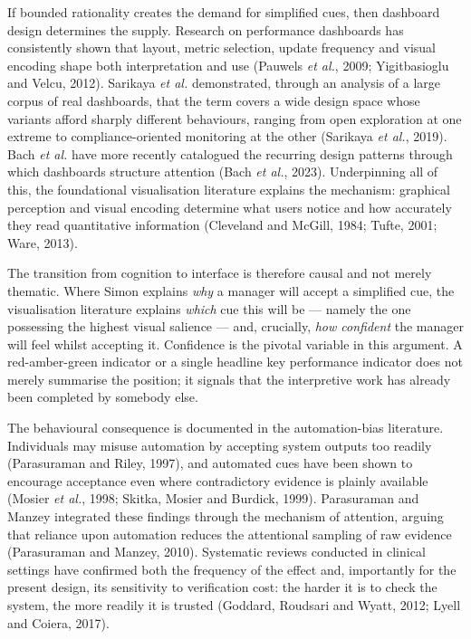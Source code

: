 \documentclass[11pt,a4paper]{article}
\numberwithin{figure}{section}
\numberwithin{table}{section}
\newcommand{\ct}[1]{\textcolor{citeblue}{#1}}          %
\begin{document}
If bounded rationality creates the demand for simplified cues, then dashboard design determines
the supply. Research on performance dashboards has consistently shown that layout, metric
selection, update frequency and visual encoding shape both interpretation and use \ct{(Pauwels
\emph{et al.}, 2009; Yigitbasioglu and Velcu, 2012)}. Sarikaya \emph{et al.} demonstrated, through
an analysis of a large corpus of real dashboards, that the term covers a wide design space whose
variants afford sharply different behaviours, ranging from open exploration at one extreme to
compliance-oriented monitoring at the other \ct{(Sarikaya \emph{et al.}, 2019)}. Bach \emph{et al.}
have more recently catalogued the recurring design patterns through which dashboards structure
attention \ct{(Bach \emph{et al.}, 2023)}. Underpinning all of this, the foundational
visualisation literature explains the mechanism: graphical perception and visual encoding
determine what users notice and how accurately they read quantitative information \ct{(Cleveland
and McGill, 1984; Tufte, 2001; Ware, 2013)}.

The transition from cognition to interface is therefore causal and not merely thematic. Where
Simon explains \emph{why} a manager will accept a simplified cue, the visualisation literature
explains \emph{which} cue this will be --- namely the one possessing the highest visual salience
--- and, crucially, \emph{how confident} the manager will feel whilst accepting it. Confidence is
the pivotal variable in this argument. A red-amber-green indicator or a single headline key
performance indicator does not merely summarise the position; it signals that the interpretive
work has already been completed by somebody else.

The behavioural consequence is documented in the automation-bias literature. Individuals may
misuse automation by accepting system outputs too readily \ct{(Parasuraman and Riley, 1997)}, and
automated cues have been shown to encourage acceptance even where contradictory evidence is
plainly available \ct{(Mosier \emph{et al.}, 1998; Skitka, Mosier and Burdick, 1999)}. Parasuraman
and Manzey integrated these findings through the mechanism of attention, arguing that reliance
upon automation reduces the attentional sampling of raw evidence \ct{(Parasuraman and Manzey,
2010)}. Systematic reviews conducted in clinical settings have confirmed both the frequency of the
effect and, importantly for the present design, its sensitivity to verification cost: the harder it
is to check the system, the more readily it is trusted \ct{(Goddard, Roudsari and Wyatt, 2012;
Lyell and Coiera, 2017)}.
\end{document}

